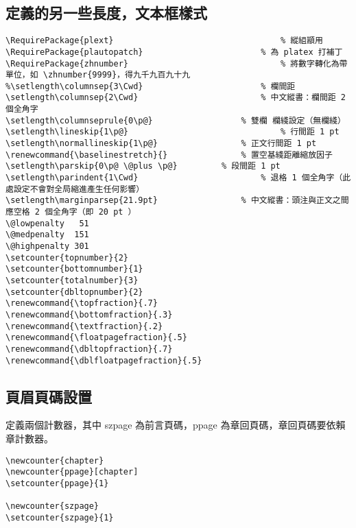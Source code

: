 \subsection{定義的另一些長度，文本框樣式}

\begin{lstlisting}[firstnumber=657]
\RequirePackage{plext}									% 縱組顓用
\RequirePackage{plautopatch}						% 為 platex 打補丁
\RequirePackage{zhnumber}								% 將數字轉化為帶單位，如 \zhnumber{9999}，得九千九百九十九
%\setlength\columnsep{3\Cwd}						% 欄間距
\setlength\columnsep{2\Cwd}							% 中文縱書：欄間距 2 個全角字
\setlength\columnseprule{0\p@}					% 雙欄 欄綫設定（無欄綫）
\setlength\lineskip{1\p@}								% 行間距 1 pt
\setlength\normallineskip{1\p@}					% 正文行間距 1 pt
\renewcommand{\baselinestretch}{}				% 置空基綫距離縮放因子
\setlength\parskip{0\p@ \@plus \p@}			% 段間距 1 pt
\setlength\parindent{1\Cwd}							% 退格 1 個全角字（此處設定不會對全局縮進產生任何影響）
\setlength\marginparsep{21.9pt}					% 中文縱書：頭注與正文之間應空格 2 個全角字（即 20 pt ）
\@lowpenalty   51
\@medpenalty  151
\@highpenalty 301
\setcounter{topnumber}{2}
\setcounter{bottomnumber}{1}
\setcounter{totalnumber}{3}
\setcounter{dbltopnumber}{2}
\renewcommand{\topfraction}{.7}
\renewcommand{\bottomfraction}{.3}
\renewcommand{\textfraction}{.2}
\renewcommand{\floatpagefraction}{.5}
\renewcommand{\dbltopfraction}{.7}
\renewcommand{\dblfloatpagefraction}{.5}
\end{lstlisting}

\subsection{頁眉頁碼設置 }

\par 定義兩個計數器，其中 szpage 為前言頁碼，ppage 為章回頁碼，章回頁碼要依賴章計數器。
\begin{lstlisting}[firstnumber=683]
\newcounter{chapter}
\newcounter{ppage}[chapter]
\setcounter{ppage}{1}

\newcounter{szpage}
\setcounter{szpage}{1}
\end{lstlisting}


